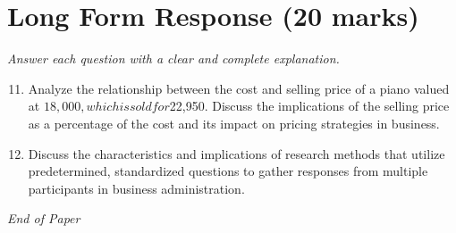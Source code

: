 \documentclass[12pt]{article}
\begin{document}
\section*{Long Form Response (20 marks)}
\textit{Answer each question with a clear and complete explanation.}
\begin{enumerate}[label=\arabic*.]
\setcounter{enumi}{10}
\item Analyze the relationship between the cost and selling price of a piano valued at $18,000, which is sold for $22,950. Discuss the implications of the selling price as a percentage of the cost and its impact on pricing strategies in business.
\item Discuss the characteristics and implications of research methods that utilize predetermined, standardized questions to gather responses from multiple participants in business administration.
\end{enumerate}

\vfill
\noindent\textit{End of Paper}
\end{document}
